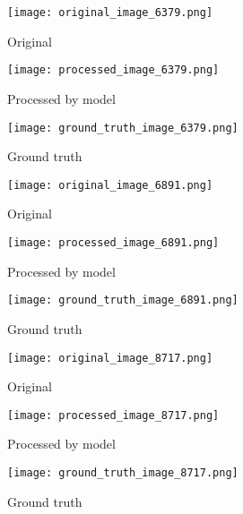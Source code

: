 \documentclass[12pt, a4paper]{article}
\begin{document}
\begin{figure}[ht]
  \centering
  \begin{minipage}[b]{0.3\textwidth}
    \texttt{[image: original\_image\_6379.png]}
    \caption{Original}
    \label{fig:original_6}
  \end{minipage}
  \hfill
  \begin{minipage}[b]{0.3\textwidth}
    \texttt{[image: processed\_image\_6379.png]}
    \caption{Processed by model}
    \label{fig:processed_6}
  \end{minipage}
  \hfill
  \begin{minipage}[b]{0.3\textwidth}
    \texttt{[image: ground\_truth\_image\_6379.png]}
    \caption{Ground truth}
    \label{fig:ground_truth_6}
  \end{minipage}
\end{figure}

\begin{figure}[ht]
  \centering
  \begin{minipage}[b]{0.3\textwidth}
    \texttt{[image: original\_image\_6891.png]}
    \caption{Original}
    \label{fig:original_7}
  \end{minipage}
  \hfill
  \begin{minipage}[b]{0.3\textwidth}
    \texttt{[image: processed\_image\_6891.png]}
    \caption{Processed by model}
    \label{fig:processed_7}
  \end{minipage}
  \hfill
  \begin{minipage}[b]{0.3\textwidth}
    \texttt{[image: ground\_truth\_image\_6891.png]}
    \caption{Ground truth}
    \label{fig:ground_truth_7}
  \end{minipage}
\end{figure}

\begin{figure}[ht]
  \centering
  \begin{minipage}[b]{0.3\textwidth}
    \texttt{[image: original\_image\_8717.png]}
    \caption{Original}
    \label{fig:original_8}
  \end{minipage}
  \hfill
  \begin{minipage}[b]{0.3\textwidth}
    \texttt{[image: processed\_image\_8717.png]}
    \caption{Processed by model}
    \label{fig:processed_8}
  \end{minipage}
  \hfill
  \begin{minipage}[b]{0.3\textwidth}
    \texttt{[image: ground\_truth\_image\_8717.png]}
    \caption{Ground truth}
    \label{fig:ground_truth_8}
  \end{minipage}
\end{figure}
\end{document}
